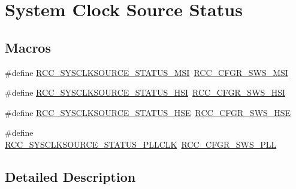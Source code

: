 \hypertarget{group___r_c_c___system___clock___source___status}{\section{System Clock Source Status}
\label{group___r_c_c___system___clock___source___status}
}
\subsection*{Macros}
\begin{DoxyCompactItemize}
\item 
\#define \hyperlink{group___r_c_c___system___clock___source___status_gaf1cd59e7fe325bc5b765ae8171d6ce64}{R\-C\-C\-\_\-\-S\-Y\-S\-C\-L\-K\-S\-O\-U\-R\-C\-E\-\_\-\-S\-T\-A\-T\-U\-S\-\_\-\-M\-S\-I}~\hyperlink{group___peripheral___registers___bits___definition_gab22f5fe5aca788772b1596d5155628c5}{R\-C\-C\-\_\-\-C\-F\-G\-R\-\_\-\-S\-W\-S\-\_\-\-M\-S\-I}
\item 
\#define \hyperlink{group___r_c_c___system___clock___source___status_ga0d6c2b0b2d59e6591295649853bb2abd}{R\-C\-C\-\_\-\-S\-Y\-S\-C\-L\-K\-S\-O\-U\-R\-C\-E\-\_\-\-S\-T\-A\-T\-U\-S\-\_\-\-H\-S\-I}~\hyperlink{group___peripheral___registers___bits___definition_ga6764639cf221e1ebc0b5448dcaed590a}{R\-C\-C\-\_\-\-C\-F\-G\-R\-\_\-\-S\-W\-S\-\_\-\-H\-S\-I}
\item 
\#define \hyperlink{group___r_c_c___system___clock___source___status_ga3847769265bf19becf7b976a7e908a64}{R\-C\-C\-\_\-\-S\-Y\-S\-C\-L\-K\-S\-O\-U\-R\-C\-E\-\_\-\-S\-T\-A\-T\-U\-S\-\_\-\-H\-S\-E}~\hyperlink{group___peripheral___registers___bits___definition_gae09a0202f441c1a43e69c62331d50a08}{R\-C\-C\-\_\-\-C\-F\-G\-R\-\_\-\-S\-W\-S\-\_\-\-H\-S\-E}
\item 
\#define \hyperlink{group___r_c_c___system___clock___source___status_ga4f05019ec09da478d084f44dbaad7d6d}{R\-C\-C\-\_\-\-S\-Y\-S\-C\-L\-K\-S\-O\-U\-R\-C\-E\-\_\-\-S\-T\-A\-T\-U\-S\-\_\-\-P\-L\-L\-C\-L\-K}~\hyperlink{group___peripheral___registers___bits___definition_ga2c67e2279804a83ef24438267d9d4a6c}{R\-C\-C\-\_\-\-C\-F\-G\-R\-\_\-\-S\-W\-S\-\_\-\-P\-L\-L}
\end{DoxyCompactItemize}


\subsection{Detailed Description}



